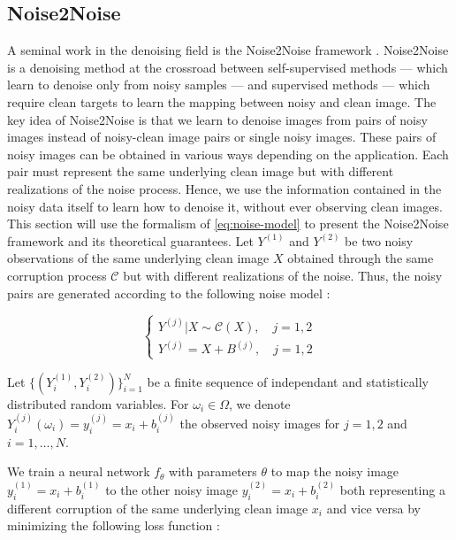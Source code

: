\subsection{\label{sec:noise2noise}Noise2Noise}

A seminal work in the denoising field is the Noise2Noise framework \cite{lehtinen_noise2noise_2018}.
Noise2Noise is a denoising method at the crossroad between self-supervised methods — which learn to denoise only from noisy samples — and supervised methods — which require clean targets to learn the mapping between noisy and clean image.
The key idea of Noise2Noise is that we learn to denoise images from pairs of noisy images instead of noisy-clean image pairs or single noisy images.
These pairs of noisy images can be obtained in various ways depending on the application. Each pair must represent the same underlying clean image but with different realizations of the noise process.
Hence, we use the information contained in the noisy data itself to learn how to denoise it, without ever observing clean images. \\

This section will use the formalism of \ref{eq:noise-model} to present the Noise2Noise framework and its theoretical guarantees.
Let $Y^{(1)}$ and $Y^{(2)}$ be two noisy observations of the same underlying clean image $X$ obtained through the same corruption process $\mathcal{C}$ but with different realizations of the noise.
Thus, the noisy pairs are generated according to the following noise model :

\begin{equation}
    \begin{cases}
        Y^{(j)} | X \sim \mathcal{C}(X), \quad j = 1, 2 \\
        Y^{(j)}  = X + B^{(j)}, \quad j = 1, 2
    \end{cases}
    \label{eq:additive_noise}
\end{equation}

Let $\{(Y_i^{(1)}, Y_i^{(2)})\}_{i=1}^N$ be a finite sequence of independant and statistically distributed random variables.
For $\omega_i \in \Omega$, we denote $Y_i^{(j)}(\omega_i) = y_i^{(j)} = x_i + b_i^{(j)}$ the observed noisy images for $j = 1, 2$ and $i = 1, \dots, N$.

We train a neural network $f_\theta$ with parameters $\theta$ to map the noisy image $y_i^{(1)} = x_i + b_i^{(1)}$ to the other noisy image $y_i^{(2)} = x_i + b_i^{(2)}$ both representing a different corruption of the same underlying clean image $x_i$ and vice versa by minimizing the following loss function :


